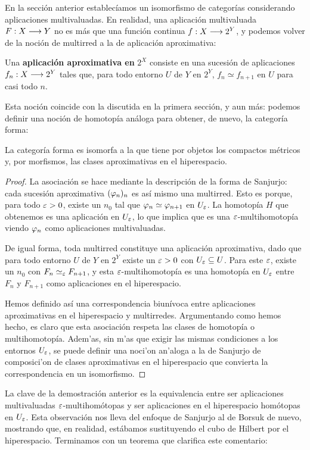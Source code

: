 En la sección anterior establecíamos un isomorfismo de categorías considerando aplicaciones multivaluadas. En realidad, una aplicación multivaluada $ F:X\longrightarrow Y  $ no es más que una función continua $ f:X\longrightarrow 2^Y  $, y podemos volver de la noción de multirred a la de aplicación aproximativa:
\begin{definition}
  Una \textbf{aplicación aproximativa en} $ 2^X $ consiste en una sucesión de aplicaciones $ f_n: X\longrightarrow 2^Y  $ tales que, para todo entorno $ U  $ de $ Y $ en $ 2^Y  $, $ f_n\simeq f_{n+1} $ en $ U  $ para casi todo $ n  $.
\end{definition}
Esta noción coincide con la discutida en la primera sección, y aun más: podemos definir una noción de homotopía análoga para obtener, de nuevo, la categoría forma:
\begin{theorem}
 La categoría forma es isomorfa a la que tiene por objetos los compactos métricos y, por morfismos, las clases aproximativas en el hiperespacio.
\end{theorem}
\begin{proof}
  La asociación se hace mediante la descripción de la forma de Sanjurjo: cada sucesión aproximativa $ (\varphi_n)_n$ es así mismo una multirred. Esto es porque, para todo $ \varepsilon>0  $, existe un $ n_0 $ tal que $ \varphi_n\simeq \varphi_{n+1} $ en $ U_\varepsilon  $. La homotopía $ H  $  que obtenemos es una aplicación en $ U_\varepsilon  $, lo que implica que es una $ \varepsilon  $-multihomotopía viendo $ \varphi_n  $ como aplicaciones multivaluadas. 

  De igual forma, toda multirred constituye una aplicación aproximativa, dado que para todo entorno $ U $ de $ Y  $ en $ 2^Y  $ existe un $ \varepsilon>0  $ con $ U_\varepsilon\subseteq U  $. Para este $\varepsilon  $, existe un $ n_0 $ con $ F_n\simeq_\varepsilon F_{n+1 } $, y esta $ \varepsilon  $-multihomotopía es una homotopía en $ U_\varepsilon  $ entre $ F_n  $ y $ F_{n+1} $ como aplicaciones en el hiperespacio.

  Hemos definido así una correspondencia biunívoca entre aplicaciones aproximativas en el hiperespacio y multirredes. Argumentando como hemos hecho, es claro que esta asociación respeta las clases de homotopía o multihomotopía. Adem'as, sin m'as que exigir las mismas condiciones a los entornos $U_\varepsilon$, se puede definir una noci'on an'aloga a la de Sanjurjo de composici'on de clases aproximativas en el hiperespacio que convierta la correspondencia en un isomorfismo.
\end{proof}

La clave de la demostración anterior es la equivalencia entre ser aplicaciones multivaluadas $ \varepsilon  $-multihomótopas y ser aplicaciones en el hiperespacio homótopas en $ U_\varepsilon  $. Esta observación nos lleva del enfoque de Sanjurjo al de Borsuk de nuevo, mostrando que, en realidad, estábamos sustituyendo el cubo de Hilbert por el hiperespacio. Terminamos con un teorema que clarifica este comentario:


